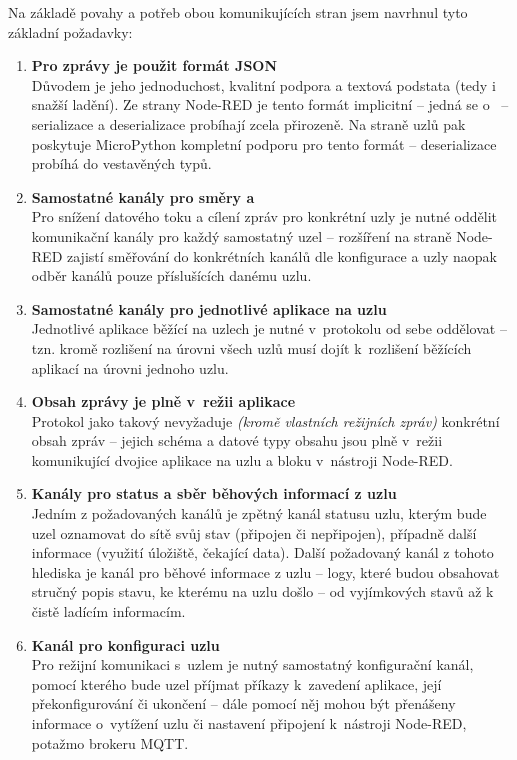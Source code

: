 Na základě povahy a potřeb obou komunikujících stran jsem navrhnul tyto základní požadavky:
\begin{enumerate}
    \item \textbf{Pro zprávy je použit formát JSON} \\
    Důvodem je jeho jednoduchost, kvalitní podpora a textová podstata (tedy i snažší ladění).
    Ze strany Node-RED je tento formát implicitní -- jedná se o~ -- serializace a
    deserializace probíhají zcela přirozeně.
    Na straně uzlů pak poskytuje MicroPython kompletní podporu pro tento formát -- deserializace probíhá do
    vestavěných typů.

    \item \textbf{Samostatné kanály pro směry  a } \\
    Pro snížení datového toku a cílení zpráv pro konkrétní uzly je nutné oddělit komunikační kanály pro každý
    samostatný uzel -- rozšíření na straně Node-RED zajistí směřování do konkrétních kanálů dle konfigurace a uzly
    naopak odběr kanálů pouze příslušících danému uzlu.

    \item \textbf{Samostatné kanály pro jednotlivé aplikace na uzlu} \\
    Jednotlivé aplikace běžící na uzlech je nutné v~protokolu od sebe oddělovat -- tzn. kromě rozlišení na úrovni
    všech uzlů musí dojít k~rozlišení běžících aplikací na úrovni jednoho uzlu.

    \item \textbf{Obsah zprávy je plně v~režii aplikace} \\
    Protokol jako takový nevyžaduje \emph{(kromě vlastních režijních zpráv)} konkrétní obsah zpráv -- jejich schéma a
    datové typy obsahu jsou plně v~režii komunikující dvojice aplikace na uzlu a bloku v~nástroji Node-RED.

    \item \textbf{Kanály pro status a sběr běhových informací z uzlu} \\
    Jedním z požadovaných kanálů je zpětný kanál statusu uzlu, kterým bude uzel oznamovat do sítě svůj stav (připojen či
    nepřipojen), případně další informace (využití úložiště, čekající data).
    Další požadovaný kanál z tohoto hlediska je kanál pro běhové informace z uzlu -- logy, které budou obsahovat
    stručný popis stavu, ke kterému na uzlu došlo -- od vyjímkových stavů až k čistě ladícím informacím.

    \item \textbf{Kanál pro konfiguraci uzlu} \\
    Pro režijní komunikaci s~uzlem je nutný samostatný konfigurační kanál, pomocí kterého bude uzel příjmat příkazy
    k~zavedení aplikace, její překonfigurování či ukončení -- dále pomocí něj mohou být přenášeny informace o~vytížení
    uzlu či nastavení připojení k~nástroji Node-RED, potažmo brokeru MQTT.
\end{enumerate}

